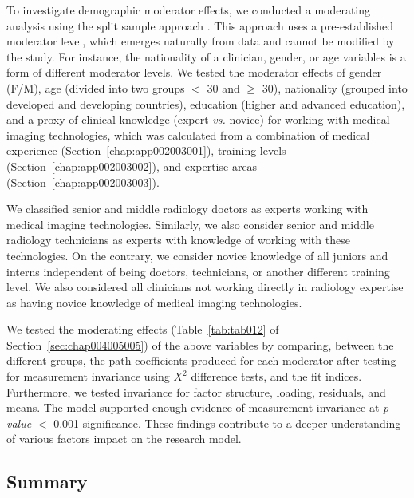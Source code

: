 To investigate demographic moderator effects, we conducted a moderating analysis using the split sample approach \cite{LI2021106581, LI2021106929}.
This approach uses a pre-established moderator level, which emerges naturally from data and cannot be modified by the study.
For instance, the nationality of a clinician, gender, or age variables is a form of different moderator levels.
We tested the moderator effects of gender (F/M), age (divided into two groups $<$ 30 and $\geq$ 30), nationality (grouped into developed and developing countries), education (higher and advanced education), and a proxy of clinical knowledge (expert {\it vs.} novice) for working with medical imaging technologies, which was calculated from a combination of medical experience (Section~\ref{chap:app002003001}), training levels (Section~\ref{chap:app002003002}), and expertise areas (Section~\ref{chap:app002003003}).

We classified senior and middle radiology doctors as experts working with medical imaging technologies.
Similarly, we also consider senior and middle radiology technicians as experts with knowledge of working with these technologies.
On the contrary, we consider novice knowledge of all juniors and interns independent of being doctors, technicians, or another different training level.
We also considered all clinicians not working directly in radiology expertise as having novice knowledge of medical imaging technologies.

We tested the moderating effects (Table~\ref{tab:tab012} of Section~\ref{sec:chap004005005}) of the above variables by comparing, between the different groups, the path coefficients produced for each moderator after testing for measurement invariance using $X^2$ difference tests, and the fit indices.
Furthermore, we tested invariance for factor structure, loading, residuals, and means.
The model supported enough evidence of measurement invariance at {\it p-value} $<$ 0.001 significance.
These findings contribute to a deeper understanding of various factors impact on the research model.

\subsection{Summary}
\label{chap:app002004006}

